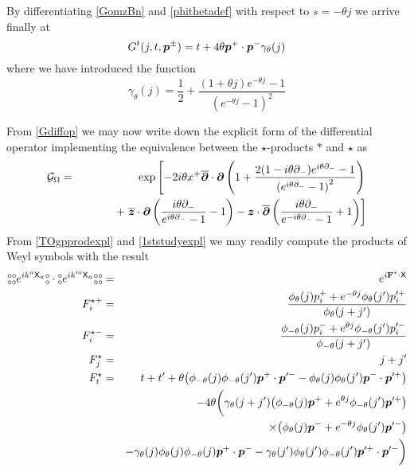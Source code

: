 By differentiating \eqref{GomzBn} and \eqref{phithetadef} with respect
to $s=-\theta j$ we arrive finally at
\begin{equation}
  \label{Gt}
  G^t(j,t,{{\boldsymbol {p} }}^\pm)=t+4\theta {{\boldsymbol {p} }}^+\cdot{{\boldsymbol {p} }}^-\gamma_\theta(j)
\end{equation}
where we have introduced the function
\begin{equation}
  \label{gammathetadef}
  \gamma_\theta(j)=\frac12+\frac{(1+\theta j)  e^{-\theta j}-1}
  {\left( e^{-\theta j}-1\right)^2}
\end{equation}

From \eqref{Gdiffop} we may now write down the explicit form of the
differential operator implementing the equivalence between the
$\star$-products $*$ and $\star$ as
\begin{eqnarray}
  \label{Gdiffopexpl}
  \mathcal{G}_\Omega&=&\exp\left[-2 i\theta x^+ \overline{{{\boldsymbol {\partial} }}}
    \cdot{{\boldsymbol {\partial} }}\left(1+\frac{2(1- i\theta \partial_-) 
        e^{ i\theta \partial_-}-1}{\left( e^{ i\theta \partial_-}-1
        \right)^2}\right)\right.\\\nonumber
  &&\qquad\quad+\left.
    \overline{{{\boldsymbol {z} }}}\cdot{{\boldsymbol {\partial} }}\left(\frac{ i\theta \partial_-}
      { e^{ i\theta \partial_-}-1}-1\right)-{{\boldsymbol {z} }}\cdot\overline{{{\boldsymbol {\partial} }}}
    \left(\frac{ i\theta \partial_-}
      { e^{- i\theta \partial_-}-1}+1\right)\right]
\end{eqnarray}
From \eqref{TOgpprodexpl} and \eqref{1ststudyexpl} we may readily compute the
products of Weyl symbols with the result
\begin{eqnarray}
  \label{Weylgpprodexpl}
  \mbox{$\substack{\circ\\\circ}$}  \mbox{$\substack{\circ\\\circ}$}  e^{ i k^a {\sf X}_a} \mbox{$\substack{\circ\\\circ}$}\cdot\mbox{$\substack{\circ\\\circ}$}  e^{ i k^{\prime a} {\sf X}_a}
  \mbox{$\substack{\circ\\\circ}$}  \mbox{$\substack{\circ\\\circ}$} &=& e^{i{\bf F}^\star\cdot{\sf X}}\\\nonumber
  F^{\star+}_i&=& \frac{\phi_\theta(j) p_i^++
        e^{-\theta j}\phi_\theta(j') p_i^{ \prime +}}{\phi_\theta(j+j')}\\\nonumber
  F^{\star-}_i&=& \frac{{\phi_{-\theta}(j)} p_i^-+
    e^{\theta j}{\phi_{-\theta}(j')} p_i^{\prime -}}{\phi_{-\theta}(j+j')}\\\nonumber
  F^\star_j&=& j+j'\\\nonumber
  F^\star_t&=&t+t'+\theta \bigl( \phi_{-\theta}(j) 
    \phi_{-\theta}(j' ) {{\boldsymbol {p} }}^+\cdot{{\boldsymbol {p} }}^{\prime -}-\phi_{\theta}(j) 
    \phi_{\theta}(j' ) {{\boldsymbol {p} }}^-\cdot{{\boldsymbol {p} }}^{\prime +}\bigr)\\\nonumber
    &&- 4\theta \biggl(\gamma_\theta(j+j' )
      \bigl({\phi_{-\theta}(j)} 
      {{\boldsymbol {p} }}^++ e^{\theta j} {\phi_{-\theta}(j' )} {{\boldsymbol {p} }}^{\prime +} \bigr)\\\nonumber
    &&\qquad\quad\times\bigl( \phi_\theta(j)
    {{\boldsymbol {p} }}^-+ e^{-\theta j} \phi_\theta(j' ) {{\boldsymbol {p} }}^{\prime -} \bigr)\\\nonumber
    &&-\gamma_\theta(j) \phi_\theta(j) \phi_{-\theta}(j) {{\boldsymbol {p} }}^+\cdot{{\boldsymbol {p} }}^--
    \gamma_\theta(j' ) \phi_\theta(j' ) \phi_{-\theta}(j' )
    {{\boldsymbol {p} }}^{\prime +}\cdot{{\boldsymbol {p} }}^{\prime -}\biggr)
\end{eqnarray}
